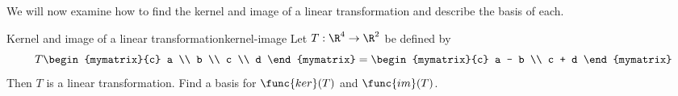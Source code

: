We will now examine how to find the kernel and image of a linear transformation and describe the basis of each. 

\begin{example}{Kernel and image of a linear transformation}{kernel-image}
Let $T: \R^4 \to \R^2$ be defined by
\[
T \begin{mymatrix}{c}
a \\
b \\
c \\
d
\end{mymatrix} = 
\begin{mymatrix}{c}
a - b \\ 
c + d
\end{mymatrix}
\]
Then $T$ is a linear transformation. Find a basis for $\func{ker}(T)$ and $\func{im}(T)$. 
\end{example}


